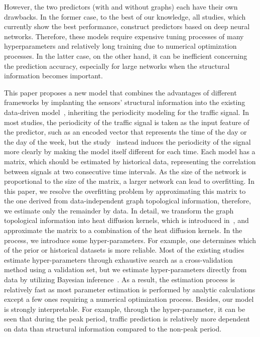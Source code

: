\documentclass[journal]{IEEEtran}
\begin{document}
However, the two predictors (with and without graphs) each have their own drawbacks.
In the former case, to the best of our knowledge, all studies, which currently show the best performance, construct predictors based on deep neural networks. Therefore, these models require expensive tuning processes of many hyperparameters and relatively long training due to numerical optimization processes.
In the latter case, on the other hand, it can be inefficient concerning the prediction accuracy, especially for large networks when the structural information becomes important.




This paper proposes a new model that combines the advantages of different frameworks by implanting the sensors' structural information into the existing data-driven model~\cite{kwak2020travel}, inheriting the periodicity modeling for the traffic signal.
In most studies, the periodicity of the traffic signal is taken as the input feature of the predictor, such as an encoded vector that represents the time of the day or the day of the week, but the study~\cite{kwak2020travel} instead induces the periodicity of the signal more clearly by making the model itself different for each time.
Each model has a matrix, which should be estimated by historical data, representing the correlation between signals at two consecutive time intervals. As the size of the network is proportional to the size of the matrix, a larger network can lead to overfitting.
In this paper, we resolve the overfitting problem by approximating this matrix to the one derived from data-independent graph topological information, therefore, we estimate only the remainder by data.
In detail, we transform the graph topological information into heat diffusion kernels, which is introduced in~\cite{kondor2002diffusion}, and approximate the matrix to a combination of the heat diffusion kernels.
In the process, we introduce some hyper-parameters. For example, one determines which of the prior or historical datasets is more reliable. Most of the existing studies estimate hyper-parameters through exhaustive search as a cross-validation method using a validation set, but we estimate hyper-parameters directly from data by utilizing Bayesian inference~\cite{mackay1992bayesian}.
As a result, the estimation process is relatively fast as most parameter estimation is performed by analytic calculations except a few ones requiring a numerical optimization process.
Besides, our model is strongly interpretable. 
For example, through the hyper-parameter, it can be seen that during the peak period, traffic prediction is relatively more dependent on data than structural information compared to the non-peak period.
\end{document}
